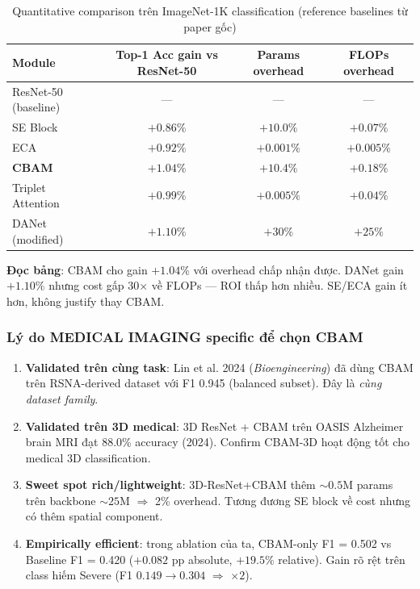 \documentclass[11pt,a4paper]{article}
\newcommand{\bad}[1]{\textcolor{bad}{#1}}
\newcommand{\best}[1]{\textcolor{best}{\textbf{#1}}}
\begin{document}
\begin{table}[h]
\centering
\caption{Quantitative comparison trên ImageNet-1K classification
(reference baselines từ paper gốc)}
\small
\begin{tabular}{@{}lccc@{}}
\toprule
\rowcolor{tablehdr}
Module & Top-1 Acc gain vs ResNet-50 & Params overhead & FLOPs overhead \\
\midrule
ResNet-50 (baseline) & --- & --- & --- \\
SE Block          & $+0.86\%$  & $+10.0\%$ & $+0.07\%$ \\
ECA               & $+0.92\%$  & $+0.001\%$ & $+0.005\%$ \\
\best{CBAM}       & \best{$+1.04\%$} & $+10.4\%$ & $+0.18\%$ \\
Triplet Attention & $+0.99\%$  & $+0.005\%$ & $+0.04\%$ \\
DANet (modified)  & $+1.10\%$ & \bad{$+30\%$} & \bad{$+25\%$} \\
\bottomrule
\end{tabular}
\end{table}

\noindent\textbf{Đọc bảng}: CBAM cho gain $+1.04\%$ với overhead chấp
nhận được. DANet gain $+1.10\%$ nhưng cost gấp 30$\times$ về FLOPs ---
ROI thấp hơn nhiều. SE/ECA gain ít hơn, không justify thay CBAM.

\subsubsection*{Lý do MEDICAL IMAGING specific để chọn CBAM}

\begin{enumerate}[leftmargin=*]
\item \textbf{Validated trên cùng task}: Lin et al. 2024
(\emph{Bioengineering}) đã dùng CBAM trên RSNA-derived dataset với
F1 0.945 (balanced subset). Đây là \emph{cùng dataset family}.
\item \textbf{Validated trên 3D medical}: 3D ResNet + CBAM trên OASIS
Alzheimer brain MRI đạt 88.0\% accuracy (2024). Confirm CBAM-3D
hoạt động tốt cho medical 3D classification.
\item \textbf{Sweet spot rich/lightweight}: 3D-ResNet+CBAM thêm
$\sim 0.5\text{M}$ params trên backbone $\sim 25\text{M}$
$\Rightarrow$ 2\% overhead. Tương đương SE block về cost nhưng có
thêm spatial component.
\item \textbf{Empirically efficient}: trong ablation của ta, CBAM-only
F1 = 0.502 vs Baseline F1 = 0.420 ($+0.082$ pp absolute, $+19.5\%$
relative). Gain rõ rệt trên class hiếm Severe (F1 $0.149 \to 0.304$
$\Rightarrow$ $\times 2$).
\end{enumerate}
\end{document}

